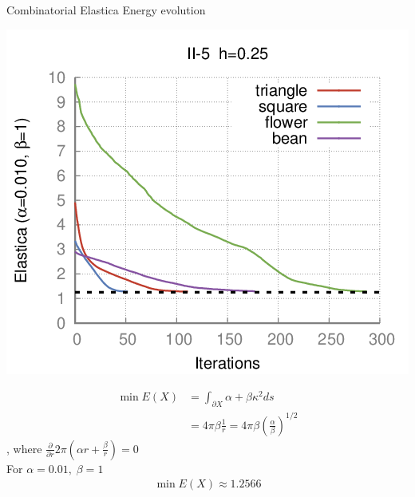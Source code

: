 \begin{frame}
	{Combinatorial Elastica}	
	{Energy evolution}

\begin{minipage}{0.49\textwidth}
\center
\includegraphics[scale=0.3]{figures/combinatorial-elastica/flow/ii/elastica/len_pen_0.01000/jonctions_1/curve_segs_4/best/gs_0.25000/summary-ii5.png}
\end{minipage}
\begin{minipage}{0.49\textwidth}
\begin{align*}
	\min E(X) &= \int_{\partial X}{ \alpha + \beta \kappa^2 ds}\\
	 &= 4\pi \beta \frac{1}{r} = 4\pi \beta \left(\frac{\alpha}{\beta}\right)^{1/2}
\end{align*}
, where $\frac{\partial }{\partial r} 2\pi(\alpha r + \frac{\beta}{r}) = 0$\\ 

%
For $\alpha=0.01,\; \beta=1$
%
\begin{align*}
	\min E(X) \approx 1.2566
\end{align*}
\end{minipage}

\vspace{1em}

	
\end{frame}

